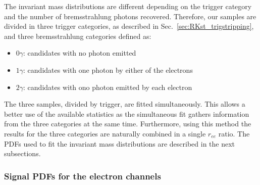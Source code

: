 The invariant mass distributions are different depending on the
trigger category and the number of bremsstrahlung photons recovered.
Therefore, our samples are divided in three trigger categories, as described in
Sec.~\ref{sec:RKst_trigstripping}, and three bremsstrahlung categories defined as:
%
\begin{itemize}
\item $0\gamma$: candidates with no photon emitted
\item $1\gamma$: candidates with one photon by either of the electrons
\item $2\gamma$: candidates with ono photon emitted by each electron
\end{itemize}
%
The three samples, divided by trigger, are fitted simultaneously.
This allows a better use of the available statistics as the simultaneous fit
gathers information from the three categories at the same time.
Furthermore, using this method the results for the three categories are
naturally combined in a single $r_{ee}$ ratio.
%
The PDFs used to fit the invariant mass distributions are described in the next subsections.



\subsubsection{Signal PDFs for the electron channels}
\label{sec:fit_ee_central}



